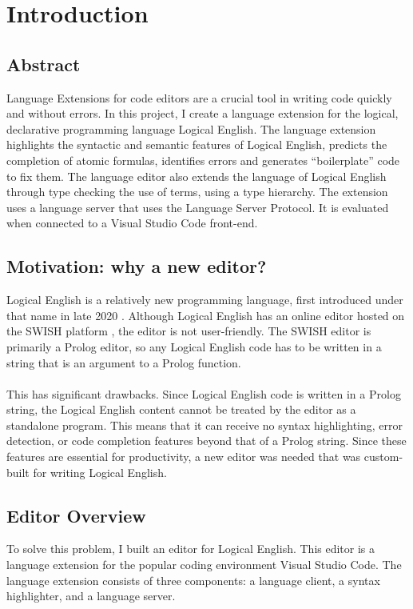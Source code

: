 \documentclass[../main.tex]{subfiles}
\begin{document}
\chapter{Introduction}
\section{Abstract}
Language Extensions for code editors are a crucial tool in writing code quickly and without errors. In this project, I create a language extension for the logical, declarative programming language Logical English. The language extension highlights the syntactic and semantic features of Logical English, predicts the completion of atomic formulas, identifies errors and generates ``boilerplate'' code to fix them. The language editor also extends the language of Logical English through type checking the use of terms, using a type hierarchy. The extension uses a language server that uses the Language Server Protocol. It is evaluated when connected to a Visual Studio Code front-end.

\section{Motivation: why a new editor?}
Logical English is a relatively new programming language, first introduced under that name in late 2020 \cite{logical_english}. Although Logical English has an online editor hosted on the SWISH platform \cite{swish_editor}, the editor is not user-friendly. The SWISH editor is primarily a Prolog editor, so any Logical English code has to be written in a string that is an argument to a Prolog function. 
\\ 
\\ 
This has significant drawbacks. Since Logical English code is written in a Prolog string, the Logical English content cannot be treated by the editor as a standalone program. This means that it can receive no syntax highlighting, error detection, or code completion features beyond that of a Prolog string. Since these features are essential for productivity, a new editor was needed that was custom-built for writing Logical English.

\section{Editor Overview}
To solve this problem, I built an editor for Logical English. This editor is a language extension for the popular coding environment Visual Studio Code. The language extension consists of three components: a language client, a syntax highlighter, and a language server. 
\end{document}
